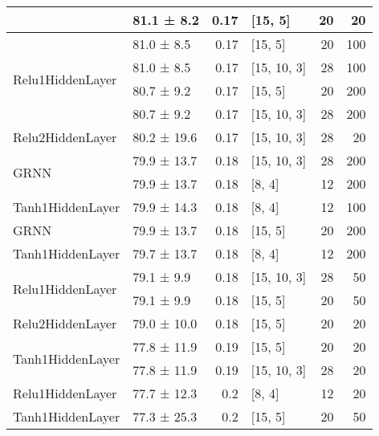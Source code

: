 \begin{table*}[h]
\begin{tabular}{llrlrr}
                                            & 81.1 ± 8.2  &  0.17 & [15, 5]        &         20 &       20 \\
 \hline
\multirow{4}{*}{Relu1HiddenLayer}   & 81.0 ± 8.5  &  0.17 & [15, 5]        &         20 &      100 \\
                                            & 81.0 ± 8.5  &  0.17 & [15, 10, 3]    &         28 &      100 \\
                                            & 80.7 ± 9.2  &  0.17 & [15, 5]        &         20 &      200 \\
                                            & 80.7 ± 9.2  &  0.17 & [15, 10, 3]    &         28 &      200 \\
 \hline
Relu2HiddenLayer                    & 80.2 ± 19.6 &  0.17 & [15, 10, 3]    &         28 &       20 \\
 \hline
\multirow{2}{*}{GRNN}               & 79.9 ± 13.7 &  0.18 & [15, 10, 3]    &         28 &      200 \\
                                            & 79.9 ± 13.7 &  0.18 & [8, 4]         &         12 &      200 \\
 \hline
Tanh1HiddenLayer                    & 79.9 ± 14.3 &  0.18 & [8, 4]         &         12 &      100 \\
 \hline
GRNN                                & 79.9 ± 13.7 &  0.18 & [15, 5]        &         20 &      200 \\
 \hline
Tanh1HiddenLayer                    & 79.7 ± 13.7 &  0.18 & [8, 4]         &         12 &      200 \\
 \hline
\multirow{2}{*}{Relu1HiddenLayer}   & 79.1 ± 9.9  &  0.18 & [15, 10, 3]    &         28 &       50 \\
                                            & 79.1 ± 9.9  &  0.18 & [15, 5]        &         20 &       50 \\
 \hline
Relu2HiddenLayer                    & 79.0 ± 10.0 &  0.18 & [15, 5]        &         20 &       20 \\
 \hline
\multirow{2}{*}{Tanh1HiddenLayer}   & 77.8 ± 11.9 &  0.19 & [15, 5]        &         20 &       20 \\
                                            & 77.8 ± 11.9 &  0.19 & [15, 10, 3]    &         28 &       20 \\
 \hline
Relu1HiddenLayer                    & 77.7 ± 12.3 &  0.2  & [8, 4]         &         12 &       20 \\
 \hline
\multirow{6}{*}{Tanh1HiddenLayer}   & 77.3 ± 25.3 &  0.2  & [15, 5]        &         20 &       50 \\

\end{tabular}
\end{table*}
